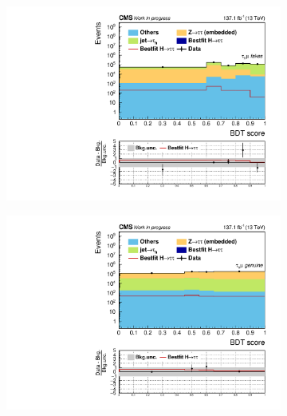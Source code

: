 \begin{figure}[!ht]
    \begin{subfigure}[b]{0.5\linewidth}
        \centering
        \includegraphics[scale=0.35]{Chapitre7/Images/histFakes.pdf} 
        \caption{} 
        \vspace{0.5ex}
    \end{subfigure}
    \begin{subfigure}[b]{0.5\linewidth}
        \centering
        \includegraphics[scale=0.35]{Chapitre7/Images/histZTT.pdf} 
        \caption{} 
        \vspace{0.5ex}
    \end{subfigure}
    \caption{}
    \label{BKGcategories}
\end{figure}

